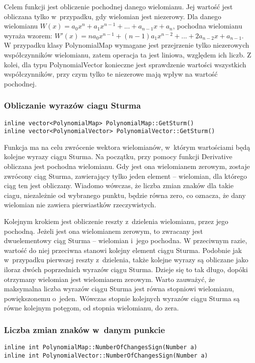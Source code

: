Celem funkcji jest obliczenie pochodnej danego wielomianu. Jej wartość jest obliczana tylko w~przypadku, gdy wielomian jest niezerowy. Dla danego wielomianu $W(x) = a_0x^n + a_1x^{n-1} + ... + a_{n-1}x + a_n$, pochodna wielomianu wyraża wzorem: $W'(x) = na_0x^{n-1} + (n-1)a_1x^{n-2} + ... + 2a_{n-2}x + a_{n-1}$. W przypadku klasy PolynomialMap wymagane jest przejrzenie tylko niezerowych współczynników wielomianu, zatem operacja ta jest liniowa, względem ich liczb. Z kolei, dla typu PolynomialVector konieczne jest sprawdzenie wartości wszystkich współczynników, przy czym tylko te niezerowe mają wpływ na wartość pochodnej.

\subsubsection{Obliczanie wyrazów ciagu Sturma}
\begin{lstlisting}
inline vector<PolynomialMap> PolynomialMap::GetSturm()
inline vector<PolynomialVector> PolynomialVector::GetSturm()
\end{lstlisting}

Funkcja ma na celu zwrócenie wektora wielomianów, w~którym wartościami będą kolejne wyrazy ciągu Sturma. Na początku, przy pomocy funkcji Derivative obliczana jest pochodna wielomianu. Gdy jest ona wielomianem zerowym, zostaje zwrócony ciąg Sturma, zawierający tylko jeden element – wielomian, dla którego ciąg ten jest obliczany. Wiadomo wówczas, że liczba zmian znaków dla takie ciagu, niezależnie od wybranego punktu, będzie równa zero, co oznacza, że dany wielomian nie zawiera pierwiastków rzeczywistych.

Kolejnym krokiem jest obliczenie reszty z~dzielenia wielomianu, przez jego pochodną. Jeżeli jest ona wielomianem zerowym, to zwracany jest dwuelementowy ciąg Sturma – wielomian i~jego pochodna. W przeciwnym razie, wartość do niej przeciwna stanowi kolejny element ciągu Sturma. Podobnie jak w~przypadku pierwszej reszty z~dzielenia, także kolejne wyrazy są obliczane jako iloraz dwóch poprzednich wyrazów ciągu Sturma. Dzieje się to tak długo, dopóki otrzymany wielomian jest wielomianem zerowym. Warto zauważyć, że maksymalna liczba wyrazów ciągu Sturma jest równa stopniowi wielomianu, powiększonemu o~jeden. Wówczas stopnie kolejnych wyrazów ciągu Sturma są równe kolejnym potęgom, od stopnia wielomianu, do zera.

\subsubsection{Liczba zmian znaków w~danym punkcie}
\begin{lstlisting}
inline int PolynomialMap::NumberOfChangesSign(Number a)
inline int PolynomialVector::NumberOfChangesSign(Number a)
\end{lstlisting}

